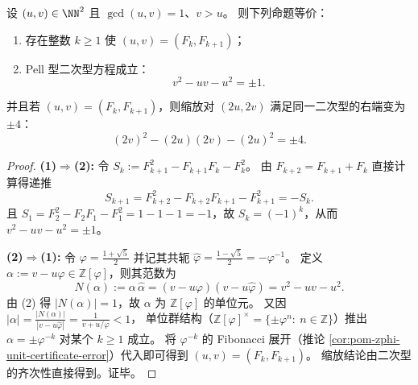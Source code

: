 \begin{proposition}\label{prop:pom-fib-pell-quadratic-characterization}
设 \((u,v)\in\NN^2\) 且 \(\gcd(u,v)=1\)、\(v>u\)。
则下列命题等价：
\begin{enumerate}
  \item 存在整数 \(k\ge 1\) 使 \((u,v)=(F_k,F_{k+1})\)；
  \item Pell 型二次型方程成立：
  \[
  \boxed{\;v^2-uv-u^2=\pm 1.\;}
  \]
\end{enumerate}
并且若 \((u,v)=(F_k,F_{k+1})\)，则缩放对 \((2u,2v)\) 满足同一二次型的右端变为 \(\pm 4\)：
\[
(2v)^2-(2u)(2v)-(2u)^2=\pm 4.
\]
\end{proposition}
\begin{proof}
\textbf{(1)\(\Rightarrow\)(2):}
令
\(
S_k:=F_{k+1}^2-F_{k+1}F_k-F_k^2
\)。
由 \(F_{k+2}=F_{k+1}+F_k\) 直接计算得递推
\[
S_{k+1}=F_{k+2}^2-F_{k+2}F_{k+1}-F_{k+1}^2=-S_k.
\]
且 \(S_1=F_2^2-F_2F_1-F_1^2=1-1-1=-1\)，故 \(S_k=(-1)^k\)，从而 \(v^2-uv-u^2=\pm 1\)。
\par
\textbf{(2)\(\Rightarrow\)(1):}
令 \(\varphi=\frac{1+\sqrt5}{2}\) 并记其共轭 \(\widehat\varphi=\frac{1-\sqrt5}{2}=-\varphi^{-1}\)。
定义
\(
\alpha:=v-u\varphi\in\mathbb{Z}[\varphi]
\)，则其范数为
\[
N(\alpha):=\alpha\,\widehat\alpha=(v-u\varphi)(v-u\widehat\varphi)=v^2-uv-u^2.
\]
由 (2) 得 \(|N(\alpha)|=1\)，故 \(\alpha\) 为 \(\mathbb{Z}[\varphi]\) 的单位元。
又因
\(
|\alpha|=\frac{|N(\alpha)|}{|v-u\widehat\varphi|}=\frac{1}{v+u/\varphi}<1
\)，
单位群结构（\(\mathbb{Z}[\varphi]^\times=\{\pm\varphi^n:\ n\in\mathbb{Z}\}\)）推出 \(\alpha=\pm\varphi^{-k}\) 对某个 \(k\ge 1\) 成立。
将 \(\varphi^{-k}\) 的 Fibonacci 展开（推论 \ref{cor:pom-zphi-unit-certificate-error}）代入即可得到 \((u,v)=(F_k,F_{k+1})\)。
缩放结论由二次型的齐次性直接得到。证毕。
\end{proof}

